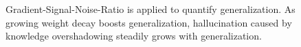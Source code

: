 \begin{figure}[htb]
\centering
{}
\vspace{-0.8em}
\caption{Gradient-Signal-Noise-Ratio is applied to quantify generalization. As growing weight decay boosts generalization, hallucination caused by knowledge overshadowing steadily grows with generalization.}
\label{fig:eliminator}
\vspace{-0.9em}
\end{figure}